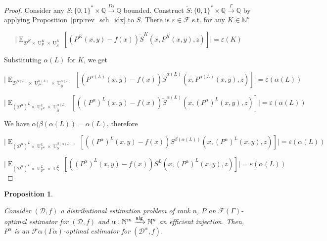 \documentclass[11pt]{article}
\numberwithin{equation}{section}
\theoremstyle{definition}
\theoremstyle{plain}
\newtheorem{proposition}{Proposition}[section]
\newcommand{\Bool}{\{0,1\}}
\newcommand{\Words}{{\Bool^*}}
\DeclareMathOperator{\E}{E}
\DeclareMathOperator{\Un}{U}
\newcommand{\Nats}{\mathbb{N}}
\newcommand{\Rats}{\mathbb{Q}}
\newcommand{\Abs}[1]{\lvert #1 \rvert}
\newcommand{\Dist}{\mathcal{D}}
\newcommand{\Fall}{\mathcal{F}}
\newcommand{\EG}{\Fall(\Gamma)}
\newcommand{\Alg}{\xrightarrow{\textnormal{alg}}}
\newcommand{\Scheme}{\xrightarrow{\Gamma}}
\begin{document}
\begin{proof}

Consider any ${S: \Words \times \Rats \xrightarrow{\Gamma \alpha} \Rats}$ bounded. Construct ${\tilde{S}: \Words \times \Rats \Scheme \Rats}$ by applying Proposition~\ref{prp:rev_sch_idx} to ${S}$. There is ${\varepsilon \in \Fall}$ s.t. for any ${K \in \Nats^n}$

\[\Abs{\E_{\Dist^{K} \times \Un_P^K \times \Un_{\tilde{S}}^K}[(P^K(x,y) - f(x))\tilde{S}^K(x,P^K(x,y),z)]}=\varepsilon(K)\]

Substituting ${\alpha(L)}$ for ${K}$, we get

\[\Abs{\E_{\Dist^{\alpha(L)} \times \Un_P^{\alpha(L)} \times \Un_{\tilde{S}}^{\alpha(L)}}[(P^{\alpha(L)}(x,y) - f(x))\tilde{S}^{\alpha(L)}(x,P^{\alpha(L)}(x,y),z)]}=\varepsilon(\alpha(L))\]

\[\Abs{\E_{(\Dist^\alpha)^{L} \times \Un_{P^\alpha}^{L} \times \Un_{\tilde{S}}^{\alpha(L)}}[((P^\alpha)^{L}(x,y) - f(x))\tilde{S}^{\alpha(L)}(x,(P^\alpha)^{L}(x,y),z)]}=\varepsilon(\alpha(L))\]

We have ${\alpha(\beta(\alpha(L))=\alpha(L)}$, therefore

\[\Abs{\E_{(\Dist^\alpha)^{L} \times \Un_{P^\alpha}^{L} \times \Un_{S}^{\beta(\alpha(L))}}[((P^\alpha)^{L}(x,y) - f(x))S^{\beta(\alpha(L))}(x,(P^\alpha)^{L}(x,y),z)]}=\varepsilon(\alpha(L))\]

\[\Abs{\E_{(\Dist^\alpha)^{L} \times \Un_{P^\alpha}^{L} \times \Un_{S}^{L}}[((P^\alpha)^{L}(x,y) - f(x))S^{L}(x,(P^\alpha)^{L}(x,y),z)]}=\varepsilon(\alpha(L))\]
%
\end{proof}

\begin{samepage}
\begin{proposition}
\label{prp:idx_reduce}

Consider $(\Dist,f)$ a distributional estimation problem of rank ${n}$, ${P}$ an ${\EG}$-optimal estimator for ${(\Dist,f)}$ and ${\alpha: \Nats^m \Alg \Nats^n}$ an efficient injection. Then, ${P^\alpha}$ is an ${\Fall \alpha(\Gamma \alpha)}$-optimal estimator for ${(\Dist^\alpha,f)}$.

\end{proposition}
\end{samepage}
\end{document}
